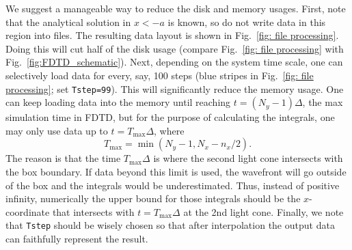 \documentclass[final,1p,times]{elsarticle}
\begin{document}
We suggest a manageable way to reduce the disk and memory usages. First, note that the analytical solution in $x<-a$ is known, so do not write data in this region into files. The resulting data layout is shown in Fig.~\ref{fig: file processing}. Doing this will cut half of the disk usage (compare Fig.~\ref{fig: file processing} with Fig.~\ref{fig:FDTD_schematic}). Next, depending on the system time scale, one can selectively load data for every, say, 100 steps (blue stripes in Fig.~\ref{fig: file processing}; set \texttt{Tstep=99}). This will significantly reduce the memory usage. One can keep loading data into the memory until reaching $t=(N_y-1)\Delta$, the max simulation time in FDTD, but for the purpose of calculating the integrals, one may only use data up to $t=T_\text{max}\Delta$, where
\begin{equation}
T_\text{max}=\min(N_y-1, N_x-n_x/2).
\end{equation}
The reason is that the time $T_\text{max}\Delta$ is where the second light cone intersects with the box boundary. If data beyond this limit is used, the wavefront will go outside of the box and the integrals would be underestimated. Thus, instead of positive infinity, numerically the upper bound for those integrals should be the $x$-coordinate that intersects with $t=T_\text{max}\Delta$ at the 2nd light cone.
Finally, we note that \texttt{Tstep} should be wisely chosen so that after interpolation the output data can faithfully represent the result.






%



\end{document}
